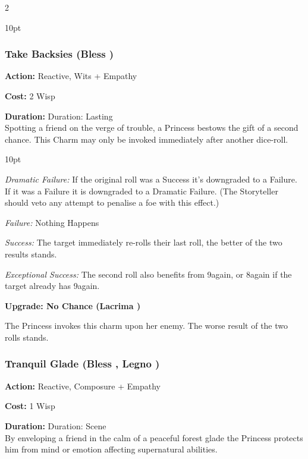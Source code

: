 \begin{multicols}{2}
\begin{myindentpar}{10pt}
\end{myindentpar}

\subsubsection*{Take Backsies (Bless \textbullet\textbullet)}

\noindent \textbf{Action:} Reactive, Wits + Empathy

\noindent \textbf{Cost:} 2 Wisp

\noindent \textbf{Duration:} Duration: Lasting \\

Spotting a friend on the verge of trouble, a Princess bestows the gift of a second chance. This Charm may only be invoked immediately after another dice-roll. 

\begin{myindentpar}{10pt}

\emph{Dramatic Failure:} If the original roll was a Success it's downgraded to a Failure. If it was a Failure it is downgraded to a Dramatic Failure. (The Storyteller should veto any attempt to penalise a foe with this effect.)

\emph{Failure:} Nothing Happens 

\emph{Success:} The target immediately re-rolls their last roll, the better of the two results stands. 

\emph{Exceptional Success:} The second roll also benefits from 9again, or 8again if the target already has 9again.

\textbf{Upgrade: No Chance (Lacrima \textbullet\textbullet)}

The Princess invokes this charm upon her enemy. The worse result of the two rolls stands. 

\end{myindentpar}

\subsubsection*{Tranquil Glade (Bless \textbullet\textbullet, Legno \textbullet\textbullet\textbullet)}

\noindent \textbf{Action:} Reactive, Composure + Empathy

\noindent \textbf{Cost:} 1 Wisp

\noindent \textbf{Duration:} Duration: Scene \\

By enveloping a friend in the calm of a peaceful forest glade the Princess protects him from mind or emotion affecting supernatural abilities. 


\end{multicols}
